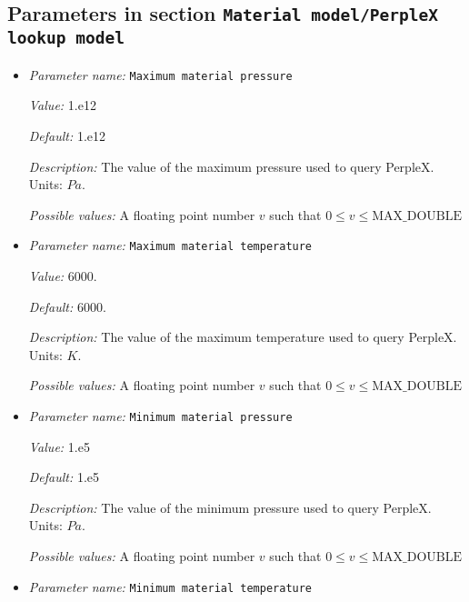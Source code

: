 \subsection{Parameters in section \tt Material model/PerpleX lookup model}
\label{parameters:Material_20model/PerpleX_20lookup_20model}

\begin{itemize}
\item {\it Parameter name:} {\tt Maximum material pressure}
\label{parameters:Material model/PerpleX lookup model/Maximum material pressure}


{\it Value:} 1.e12


{\it Default:} 1.e12


{\it Description:} The value of the maximum pressure used to query PerpleX. Units: $Pa$.


{\it Possible values:} A floating point number $v$ such that $0 \leq v \leq \text{MAX\_DOUBLE}$
\item {\it Parameter name:} {\tt Maximum material temperature}
\label{parameters:Material model/PerpleX lookup model/Maximum material temperature}


{\it Value:} 6000.


{\it Default:} 6000.


{\it Description:} The value of the maximum temperature used to query PerpleX. Units: $K$.


{\it Possible values:} A floating point number $v$ such that $0 \leq v \leq \text{MAX\_DOUBLE}$
\item {\it Parameter name:} {\tt Minimum material pressure}
\label{parameters:Material model/PerpleX lookup model/Minimum material pressure}


{\it Value:} 1.e5


{\it Default:} 1.e5


{\it Description:} The value of the minimum pressure used to query PerpleX. Units: $Pa$.


{\it Possible values:} A floating point number $v$ such that $0 \leq v \leq \text{MAX\_DOUBLE}$
\item {\it Parameter name:} {\tt Minimum material temperature}
\label{parameters:Material model/PerpleX lookup model/Minimum material temperature}



\end{itemize}
